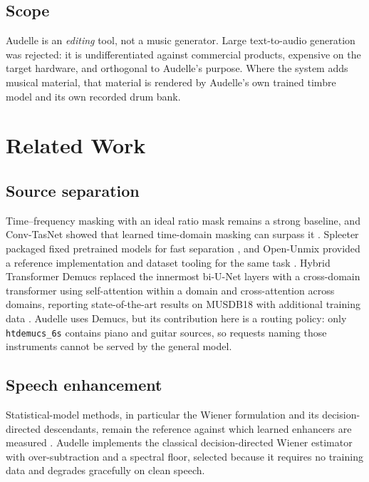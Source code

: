 \documentclass[conference]{IEEEtran}
\begin{document}
\subsection{Scope}

Audelle is an \emph{editing} tool, not a music generator. Large text-to-audio
generation was rejected: it is undifferentiated against commercial products,
expensive on the target hardware, and orthogonal to Audelle's purpose. Where
the system adds musical
material, that material is rendered by Audelle's own trained timbre model and
its own recorded drum bank.

\section{Related Work}

\subsection{Source separation}

Time--frequency masking with an ideal ratio mask remains a strong baseline, and
Conv-TasNet showed that learned time-domain masking can surpass it \cite{luo2019convtasnet}.
Spleeter packaged fixed pretrained models for fast separation \cite{hennequin2020spleeter}, and Open-Unmix
provided a reference implementation and dataset tooling for the same task \cite{stoter2019openunmix}.
Hybrid Transformer Demucs replaced the innermost bi-U-Net layers with a
cross-domain transformer using self-attention within a domain and cross-attention
across domains, reporting state-of-the-art results on MUSDB18 with additional
training data \cite{rouard2023hybrid}. Audelle uses Demucs, but its contribution here is a routing
policy: only \texttt{htdemucs\_6s} contains piano and guitar sources, so requests
naming those instruments cannot be served by the general model.

\subsection{Speech enhancement}

Statistical-model methods, in particular the Wiener formulation and its
decision-directed descendants, remain the reference against which learned
enhancers are measured \cite{ephraim1992statistical}. Audelle implements the
classical decision-directed Wiener estimator with over-subtraction and a
spectral floor, selected because it requires no training data and degrades
gracefully on clean speech.
\end{document}
